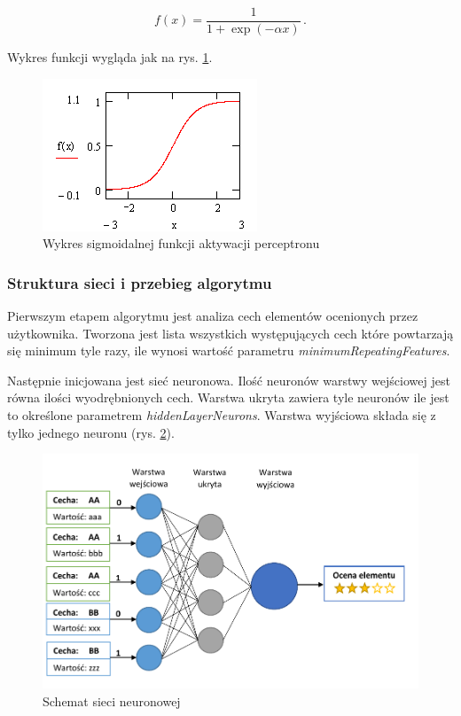 \documentclass[twoside]{iisthesis}
\begin{document}
		  \begin{equation}
		  \label{eq:sigmoidal}
		  f(x) = \frac{1}{1 + \exp(-\alpha x)}
		  \,.
		  \end{equation}

		 Wykres funkcji wygląda jak na rys. \ref{fig:sigmoid}.

 		 \begin{figure}[!ht] 
			\centering
			\includegraphics{sigmoid}
			\caption{Wykres sigmoidalnej funkcji aktywacji perceptronu \protect\cite{aforgenet}}
			\label{fig:sigmoid}
		 \end{figure}

		 \subsubsection{Struktura sieci i przebieg algorytmu}
		 
		 Pierwszym etapem algorytmu jest analiza cech elementów ocenionych przez użytkownika. Tworzona jest lista wszystkich występujących cech które powtarzają się minimum tyle razy, ile wynosi wartość  parametru \textit{minimumRepeatingFeatures}. 
		 
		 Następnie inicjowana jest sieć neuronowa. Ilość neuronów warstwy wejściowej jest równa ilości wyodrębnionych cech. Warstwa ukryta zawiera tyle neuronów ile jest to określone parametrem \textit{hiddenLayerNeurons}. Warstwa wyjściowa składa się z tylko jednego neuronu (rys. \ref{fig:siecneuronowa}). 
		 
		 \begin{figure}%
		 	\centering
		 	\includegraphics[width=1\textwidth]{siecneuronowa}
		 	\caption{Schemat sieci neuronowej}
		 	\label{fig:siecneuronowa}
		 \end{figure}
		 
\end{document}
